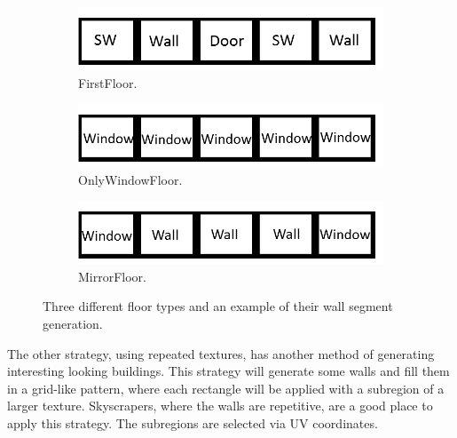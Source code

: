 \begin{figure}[H]
  \centering
  \begin{subfigure}[b]{0.32\textwidth}
    \includegraphics[width=\textwidth]{figure/FirstFloor.png}
    \caption{FirstFloor.}
  \end{subfigure}
  \quad
  \begin{subfigure}[b]{0.32\textwidth}
    \includegraphics[width=\textwidth]{figure/OnlyWindowFloor.png}
    \caption{OnlyWindowFloor.}
  \end{subfigure}
  \begin{subfigure}[b]{0.32\textwidth}
    \includegraphics[width=\textwidth]{figure/MirrorFloor.png}
    \caption{MirrorFloor.}
  \end{subfigure}
  \caption{Three different floor types and an example of their wall segment generation.}
  \label{fig:segmentsgen}
\end{figure}

The other strategy, using repeated textures, has another method of generating interesting looking buildings. 
This strategy will generate some walls and fill them in a grid-like pattern, where each rectangle will be applied with a subregion of a larger texture.
Skyscrapers, where the walls are repetitive, are a good place to apply this strategy. 
The subregions are selected via UV coordinates. 



